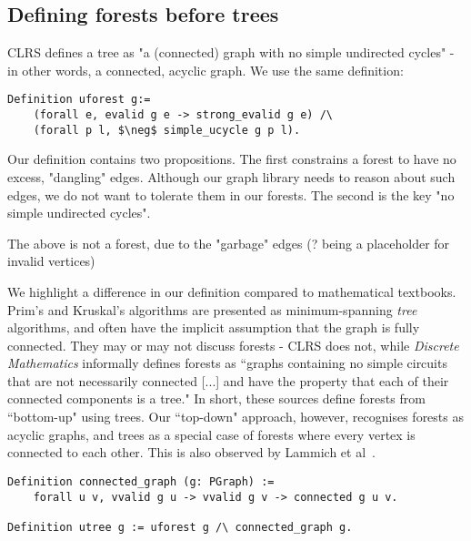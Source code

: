 \subsection{Defining forests before trees}

CLRS defines a tree as "a (connected) graph with no simple undirected cycles" - in other words, a connected, acyclic graph. We use the same definition:
\begin{lstlisting}
Definition uforest g:=
	(forall e, evalid g e -> strong_evalid g e) /\
	(forall p l, $\neg$ simple_ucycle g p l).
\end{lstlisting}
Our definition contains two propositions. The first constrains a forest to have no excess, "dangling" edges. Although our graph library needs to reason about such edges, we do not want to tolerate them in our forests. The second is the key "no simple undirected cycles".
\begin{center}
	\newline
	The above is not a forest, due to the "garbage" edges (? being a placeholder for invalid vertices)
\end{center}
We highlight a difference in our definition compared to mathematical textbooks. Prim's and Kruskal's algorithms are presented as minimum-spanning \textit{tree} algorithms, and often have the implicit assumption that the graph is fully connected. They may or may not discuss forests - CLRS does not, while \textit{Discrete Mathematics} informally defines forests as ``graphs containing no simple circuits that are not necessarily connected [...] and have the property that each of their connected components is a tree." In short, these sources define forests from ``bottom-up" using trees. Our ``top-down" approach, however, recognises forests as acyclic graphs, and trees as a special case of forests where every vertex is connected to each other. This is also observed by Lammich et al~\cite{DBLP:journals/afp/LammichN19}.
\begin{lstlisting}
Definition connected_graph (g: PGraph) :=
	forall u v, vvalid g u -> vvalid g v -> connected g u v.

Definition utree g := uforest g /\ connected_graph g.
\end{lstlisting}
